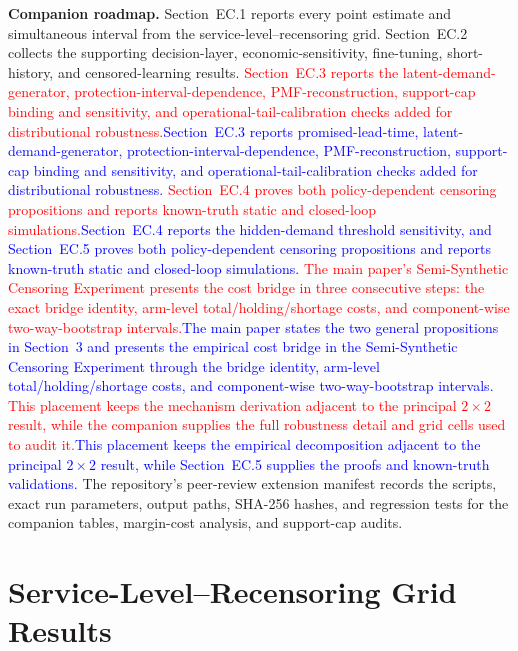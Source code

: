 \documentclass[msom,dblanonrev]{informs4}
\newcommand{\add}[1]{\textcolor{blue}{#1}}
\newcommand{\reduce}[1]{\textcolor{red}{#1}\hspace{0.5em}}
\begin{document}
\noindent\textbf{Companion roadmap.}
Section~EC.1 reports every point estimate and simultaneous interval from the service-level--recensoring grid.
Section~EC.2 collects the supporting decision-layer, economic-sensitivity, fine-tuning, short-history, and censored-learning results.
\reduce{Section~EC.3 reports the latent-demand-generator, protection-interval-dependence, PMF-reconstruction, support-cap binding and sensitivity, and operational-tail-calibration checks added for distributional robustness.}\add{Section~EC.3 reports promised-lead-time, latent-demand-generator, protection-interval-dependence, PMF-reconstruction, support-cap binding and sensitivity, and operational-tail-calibration checks added for distributional robustness.}
\reduce{Section~EC.4 proves both policy-dependent censoring propositions and reports known-truth static and closed-loop simulations.}\add{Section~EC.4 reports the hidden-demand threshold sensitivity, and Section~EC.5 proves both policy-dependent censoring propositions and reports known-truth static and closed-loop simulations.}
\reduce{The main paper's Semi-Synthetic Censoring Experiment presents the cost bridge in three consecutive steps: the exact bridge identity, arm-level total/holding/shortage costs, and component-wise two-way-bootstrap intervals.}\add{The main paper states the two general propositions in Section~3 and presents the empirical cost bridge in the Semi-Synthetic Censoring Experiment through the bridge identity, arm-level total/holding/shortage costs, and component-wise two-way-bootstrap intervals.}
\reduce{This placement keeps the mechanism derivation adjacent to the principal $2\times2$ result, while the companion supplies the full robustness detail and grid cells used to audit it.}\add{This placement keeps the empirical decomposition adjacent to the principal $2\times2$ result, while Section~EC.5 supplies the proofs and known-truth validations.}
The repository's peer-review extension manifest records the scripts, exact run parameters, output paths, SHA-256 hashes, and regression tests for the companion tables, margin-cost analysis, and support-cap audits.
\vspace{1.25em}

\section{Service-Level--Recensoring Grid Results}\label{oa:grid}
\end{document}
